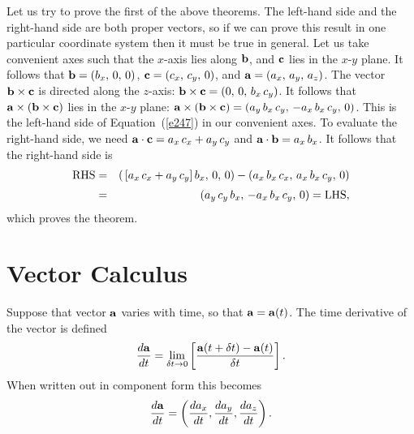 Let us try to prove the first of the above theorems. The left-hand side and the
right-hand side are both proper vectors, so if we can prove this result in one particular
coordinate system then it must be true in general. Let us take convenient axes such that the
$x$-axis lies along ${\bf b}$, and ${\bf c}$ lies in the $x$-$y$ plane. It follows that
${\bf b} = (b_x,\,0,\,0)$, ${\bf c} = (c_x,\, c_y,\, 0)$, and ${\bf a} = (a_x,\, a_y,\, a_z)$. 
The vector ${\bf b}\times {\bf c}$ is directed along the $z$-axis:
${\bf b}\times{\bf c} = (0,\,0,\,b_x\, c_y)$. It follows that ${\bf a}\times({\bf b}\times{\bf c})$
lies in the $x$-$y$ plane:  ${\bf a}\times({\bf b}\times{\bf c}) = (a_y \,b_x\, c_y,\, -a_x\, b_x\, c_y,\, 0)$.
This is the left-hand side of Equation~(\ref{e247}) in our convenient axes. To evaluate the right-hand side,
we need ${\bf a}\cdot {\bf c} = a_x \,c_x + a_y\, c_y$ and ${\bf a}\cdot {\bf b} = a_x \,b_x$.
It follows that the right-hand side is 
\begin{eqnarray}
{\rm RHS} &= &(\,[a_x\, c_x + a_y \,c_y]\, b_x,\, 0,\, 0) - (a_x \,b_x \,c_x,\, a_x\, b_x\, c_y,\, 0)\nonumber\\[0.5ex]
&=& (a_y\, c_y\, b_x,\, -a_x\, b_x\, c_y,\, 0 ) = {\rm LHS},
\end{eqnarray}
which proves the theorem.

\section{Vector Calculus} 
Suppose that  vector ${\bf a}$ varies with time, so that ${\bf a} = {\bf a} (t)$. The time
derivative of the vector is defined
\begin{equation}
\frac{d {\bf a}}{dt} = \lim_{\delta t\rightarrow 0} \left[\frac{{\bf a}(t+\delta t) - {\bf a}(t)}
{\delta t}\right].
\end{equation}
When written out in component form this becomes
\begin{equation}
\frac{d {\bf a}}{dt} = \left(\frac{d a_x}{dt}, \frac{d a_y}{d t}, \frac{d a_z}{ d t}\right).
\end{equation} 

